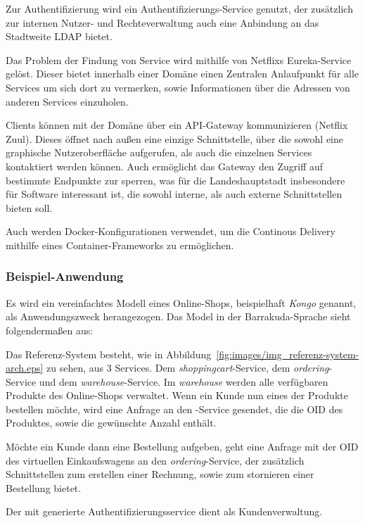 \documentclass[12pt,a4paper,bibliography=totocnumbered,listof=totocnumbered]{scrartcl}
\begin{document}
Zur Authentifizierung wird ein Authentifizierungs-Service genutzt, der zusätzlich zur internen Nutzer- und Rechteverwaltung auch eine Anbindung an das Stadtweite \ac{LDAP} bietet.

Das Problem der Findung von Service wird mithilfe von Netflixs Eureka-Service gelöst. Dieser bietet innerhalb einer Domäne einen Zentralen Anlaufpunkt für alle Services um sich dort zu vermerken, sowie Informationen über die Adressen von anderen Services einzuholen.

Clients können mit der Domäne über ein \ac{API}-Gateway kommunizieren (Netflix Zuul). Dieses öffnet nach außen eine einzige Schnittstelle, über die sowohl eine graphische Nutzeroberfläche aufgerufen, als auch die einzelnen Services kontaktiert werden können. Auch ermöglicht das Gateway den Zugriff auf bestimmte Endpunkte zur sperren, was für die Landeshauptstadt insbesondere für Software interessant ist, die sowohl interne, als auch externe Schnittstellen bieten soll.

Auch werden Docker-Konfigurationen verwendet, um die Continous Delivery mithilfe eines Container-Frameworks zu ermöglichen.

\subsubsection{Beispiel-Anwendung}

Es wird ein vereinfachtes Modell eines Online-Shops, beispielhaft \textit{Kongo} genannt, als Anwendungszweck herangezogen. Das Model in der Barrakuda-Sprache sieht folgendermaßen aus:



Das Referenz-System besteht, wie in Abbildung~\ref{fig:images/img_referenz-system-arch.eps} zu sehen, aus 3 Services. Dem \textit{shoppingcart}-Service, dem \textit{ordering}-Service und dem \textit{warehouse}-Service. Im \textit{warehouse} werden alle verfügbaren Produkte des Online-Shops verwaltet. Wenn ein Kunde nun eines der Produkte bestellen möchte, wird eine Anfrage an den -Service gesendet, die die OID des Produktes, sowie die gewünschte Anzahl enthält.

Möchte ein Kunde dann eine Bestellung aufgeben, geht eine Anfrage mit der OID des virtuellen Einkaufswagens an den \textit{ordering}-Service, der zusätzlich Schnittstellen zum erstellen einer Rechnung, sowie zum stornieren einer Bestellung bietet.

Der mit generierte Authentifizierungsservice dient als Kundenverwaltung.
\end{document}
